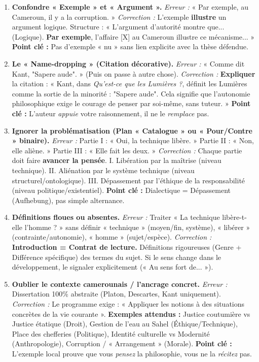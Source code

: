 \documentclass[11pt]{article}
\begin{document}
\begin{attention}
\begin{enumerate}
    \item \textbf{Confondre « Exemple » et « Argument ».} \emph{Erreur :} « Par exemple, au Cameroun, il y a la corruption. » \emph{Correction :} L'exemple \textbf{illustre} un argument logique. Structure : « L'argument d'autorité montre que... (Logique). \textbf{Par exemple}, l'affaire [X] au Cameroun illustre ce mécanisme... » \textbf{Point clé :} Pas d'exemple « nu » sans lien explicite avec la thèse défendue.
    \item \textbf{Le « Name-dropping » (Citation décorative).} \emph{Erreur :} « Comme dit Kant, "Sapere aude". » (Puis on passe à autre chose). \emph{Correction :} \textbf{Expliquer} la citation : « Kant, dans \emph{Qu'est-ce que les Lumières ?}, définit les Lumières comme la sortie de la minorité : "Sapere aude". Cela signifie que l'autonomie philosophique exige le courage de penser par soi-même, sans tuteur. » \textbf{Point clé :} L'auteur \emph{appuie} votre raisonnement, il ne le \emph{remplace} pas.
    \item \textbf{Ignorer la problématisation (Plan « Catalogue » ou « Pour/Contre » binaire).} \emph{Erreur :} Partie I : « Oui, la technique libère. » Partie II : « Non, elle aliène. » Partie III : « Elle fait les deux. » \emph{Correction :} Chaque partie doit faire \textbf{avancer la pensée}. I. Libération par la maîtrise (niveau technique). II. Aliénation par le système technique (niveau structurel/ontologique). III. Dépassement par l'éthique de la responsabilité (niveau politique/existentiel). \textbf{Point clé :} Dialectique = Dépassement (Aufhebung), pas simple alternance.
    \item \textbf{Définitions floues ou absentes.} \emph{Erreur :} Traiter « La technique libère-t-elle l'homme ? » sans définir « technique » (moyen/fin, système), « libérer » (contrainte/autonomie), « homme » (sujet/espèce). \emph{Correction :} \textbf{Introduction = Contrat de lecture.} Définitions rigoureuses (Genre + Différence spécifique) des termes du sujet. Si le sens change dans le développement, le signaler explicitement (« Au sens fort de... »).
    \item \textbf{Oublier le contexte camerounais / l'ancrage concret.} \emph{Erreur :} Dissertation 100\% abstraite (Platon, Descartes, Kant uniquement). \emph{Correction :} Le programme exige : « Appliquer les notions à des situations concrètes de la vie courante ». \textbf{Exemples attendus :} Justice coutumière vs Justice étatique (Droit), Gestion de l'eau au Sahel (Éthique/Technique), Place des chefferies (Politique), Identité culturelle vs Modernité (Anthropologie), Corruption / « Arrangement » (Morale). \textbf{Point clé :} L'exemple local prouve que vous \emph{pensez} la philosophie, vous ne la \emph{récitez} pas.
\end{enumerate}
\end{attention}
\end{document}
